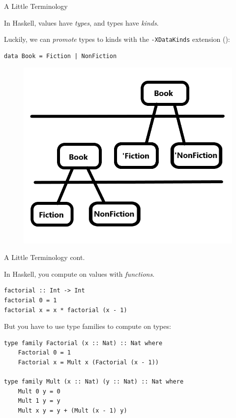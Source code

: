 \documentclass{beamer}
\newcommand{\inline}[1]{\lstinline[basicstyle=\ttfamily]{#1}}
\begin{document}
\begin{frame}[fragile]{A Little Terminology}

In Haskell, values have \emph{types}, and types have \emph{kinds}.

\pause

Luckily, we can \emph{promote} types to kinds with the \inline{-XDataKinds} extension (\cite{givingpromotion}):

\pause

\begin{lstlisting}
data Book = Fiction | NonFiction
\end{lstlisting}

\begin{figure}
    \includegraphics[height=0.6\textheight,keepaspectratio]{Promotion.png}
    \label{promotiondiagram}
\end{figure}

\end{frame}

\begin{frame}[fragile]{A Little Terminology cont.}

In Haskell, you compute on values with \emph{functions}.

\begin{lstlisting}
factorial :: Int -> Int
factorial 0 = 1
factorial x = x * factorial (x - 1)
\end{lstlisting}

\pause

But you have to use type families to compute on types:

\begin{lstlisting}
type family Factorial (x :: Nat) :: Nat where
    Factorial 0 = 1
    Factorial x = Mult x (Factorial (x - 1))
    
type family Mult (x :: Nat) (y :: Nat) :: Nat where
    Mult 0 y = 0
    Mult 1 y = y
    Mult x y = y + (Mult (x - 1) y)
\end{lstlisting}

\end{frame}
\end{document}
